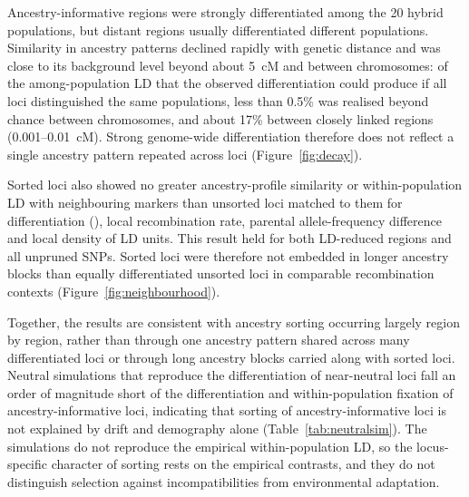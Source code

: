 Ancestry-informative regions were strongly differentiated among the 20 hybrid populations, but distant regions usually differentiated different populations. Similarity in ancestry patterns declined rapidly with genetic distance and was close to its background level beyond about 5~cM and between chromosomes: of the among-population LD that the observed differentiation could produce if all loci distinguished the same populations, less than 0.5\% was realised beyond chance between chromosomes, and about 17\% between closely linked regions (0.001--0.01~cM). Strong genome-wide differentiation therefore does not reflect a single ancestry pattern repeated across loci (Figure~\ref{fig:decay}).

Sorted loci also showed no greater ancestry-profile similarity or within-population LD with neighbouring markers than unsorted loci matched to them for differentiation (\FST), local recombination rate, parental allele-frequency difference and local density of LD units. This result held for both LD-reduced regions and all unpruned SNPs. Sorted loci were therefore not embedded in longer ancestry blocks than equally differentiated unsorted loci in comparable recombination contexts (Figure~\ref{fig:neighbourhood}).

Together, the results are consistent with ancestry sorting occurring largely region by region, rather than through one ancestry pattern shared across many differentiated loci or through long ancestry blocks carried along with sorted loci. Neutral simulations that reproduce the differentiation of near-neutral loci fall an order of magnitude short of the differentiation and within-population fixation of ancestry-informative loci, indicating that sorting of ancestry-informative loci is not explained by drift and demography alone (Table~\ref{tab:neutralsim}). The simulations do not reproduce the empirical within-population LD, so the locus-specific character of sorting rests on the empirical contrasts, and they do not distinguish selection against incompatibilities from environmental adaptation.

